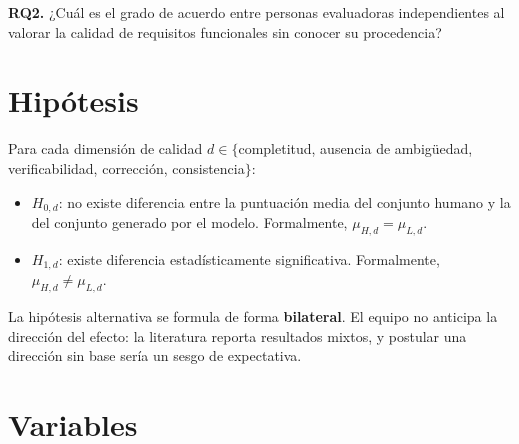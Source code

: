 \documentclass[11pt,a4paper]{article}
\begin{document}
\noindent
\textbf{RQ2.} ¿Cuál es el grado de acuerdo entre personas evaluadoras independientes al valorar la
calidad de requisitos funcionales sin conocer su procedencia?

\section{Hipótesis}

Para cada dimensión de calidad $d \in \{$completitud, ausencia de ambigüedad, verificabilidad,
corrección, consistencia$\}$:

\begin{itemize}[nosep,leftmargin=1.6em]
  \item $H_{0,d}$: no existe diferencia entre la puntuación media del conjunto humano y la del
        conjunto generado por el modelo. Formalmente, $\mu_{H,d} = \mu_{L,d}$.
  \item $H_{1,d}$: existe diferencia estadísticamente significativa. Formalmente,
        $\mu_{H,d} \neq \mu_{L,d}$.
\end{itemize}

\noindent
La hipótesis alternativa se formula de forma \textbf{bilateral}. El equipo no anticipa la dirección
del efecto: la literatura reporta resultados mixtos, y postular una dirección sin base sería un
sesgo de expectativa.

\section{Variables}
\end{document}
